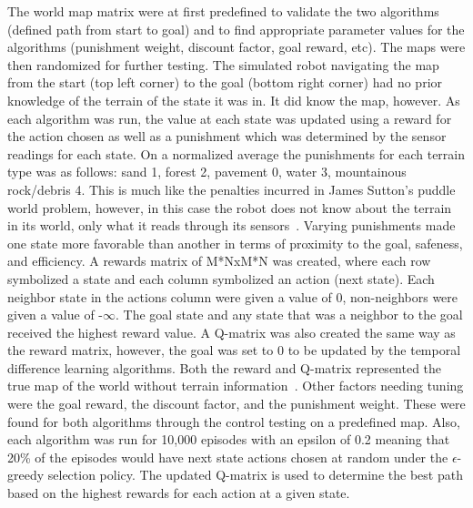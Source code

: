 \documentclass[12pt,american]{report}
\begin{document}
The world map matrix were at first predefined to validate the two algorithms (defined path from start to goal) and to find appropriate parameter values for the algorithms (punishment weight, discount factor, goal reward, etc).  The maps were then randomized for further testing.  The simulated robot navigating the map from the start (top left corner) to the goal (bottom right corner) had no prior knowledge of the terrain of the state it was in.  It did know the map, however.  As each algorithm was run, the value at each state was updated using a reward for the action chosen as well as a punishment which was determined by the sensor readings for each state. On a normalized average the punishments for each terrain type was as follows: sand 1, forest 2, pavement 0, water 3, mountainous rock/debris 4. This is much like the penalties incurred in James Sutton's puddle world problem, however, in this case the robot does not know about the terrain in its world, only what it reads through its sensors~\cite{sutton1996generalization}. Varying punishments made one state more favorable than another in terms of proximity to the goal, safeness, and efficiency. A rewards matrix of M*NxM*N was created, where each row symbolized a state and each column symbolized an action (next state).  Each neighbor state in the actions column were given a value of 0, non-neighbors were given a value of -\begin{math}\infty\end{math}. The goal state and any state that was a neighbor to the goal received the highest reward value.  A Q-matrix was also created the same way as the reward matrix, however, the goal was set to 0 to be updated by the temporal difference learning algorithms. Both the reward and Q-matrix represented the true map of the world without terrain information~\cite{tutorial}. Other factors needing tuning were the goal reward, the discount factor, and the punishment weight.  These were found for both algorithms through the control testing on a predefined map. Also, each algorithm was run for 10,000 episodes with an epsilon of 0.2 meaning that 20\% of the episodes would have next state actions chosen at random under the \begin{math}\epsilon\end{math}-greedy selection policy. The updated Q-matrix is used to determine the best path based on the highest rewards for each action at a given state.
\end{document}
